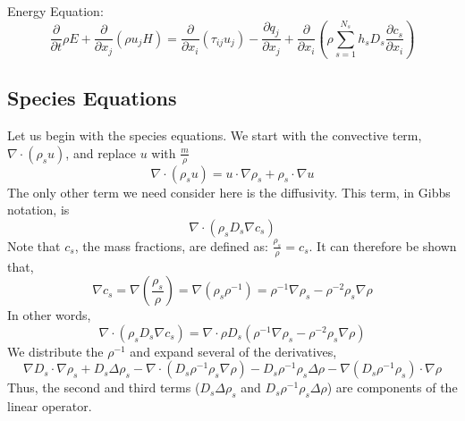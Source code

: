 \documentclass[10pt]{article}
\newcommand{\myred}[1]{{\color{red} #1}}
\begin{document}
Energy Equation:
\begin{equation}
\frac{\partial}{\partial t} \rho E + \frac{\partial }{\partial x_j}\left(\rho
u_j H\right) = \frac{\partial }{\partial x_i}\left(\tau_{ij}u_j\right) - \frac{\partial q_j
}{\partial x_j} + \frac{\partial }{\partial x_i}\left(\rho \sum^{N_s}_{s=1}
h_s D_s \frac{\partial c_s}{\partial x_i} \right)
\end{equation}



%
%
%
\subsection{Species Equations}
Let us begin with the species equations. We start with the convective
term, $\nabla \cdot (\rho_s u)$, and replace $u$ with $\frac{m}{\rho}$
\begin{equation}
  \nabla \cdot (\rho_s u) = u \cdot \nabla \rho_s + \rho_s \cdot \nabla
   u 
\end{equation}
\newline
\newline
The only other term we need consider here is 
the diffusivity. This term, in Gibbs notation, is
\begin{equation}
  \nabla \cdot (\rho_s D_s \nabla c_s)
\end{equation}
Note that $c_s$, the mass fractions, are defined as:
$\frac{\rho_s}{\rho} = 
c_s$.  It can therefore be shown that,
\begin{equation}
  \nabla c_s = \nabla (\frac{\rho_s}{\rho}) = \nabla (\rho_s \rho^{-1})
             = \rho^{-1} \nabla \rho_s - \rho^{-2} \rho_s \nabla \rho
\end{equation}
In other words,
\begin{equation}
  \label{eq:speciesdiffexpansion}
  \nabla \cdot (\rho_s D_s \nabla c_s) = \nabla \cdot \rho D_s (\rho^{-1} \nabla \rho_s - \rho^{-2} \rho_s \nabla \rho)
\end{equation}
We distribute the $\rho^{-1}$ and expand several of the derivatives,
\begin{equation}
  \nabla D_s \cdot \nabla \rho_s + D_s \Delta \rho_s - \nabla \cdot (D_s \rho^{-1} \rho_s \nabla \rho) - D_s \rho^{-1} \rho_s \Delta \rho - \nabla(D_s \rho^{-1} \rho_s) \cdot \nabla \rho
\end{equation}
Thus, the second and third terms ($D_s \Delta \rho_s$ and $D_s \rho^{-1}
\rho_s \Delta \rho$) are components of the linear operator. 
\end{document}
